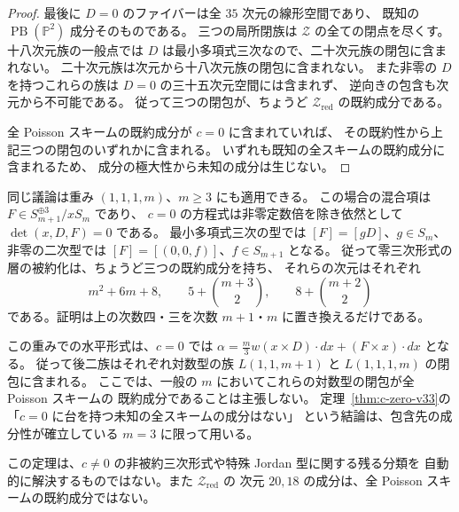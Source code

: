 \begin{proof}
最後に $D=0$ のファイバーは全 $35$ 次元の線形空間であり、
既知の $\operatorname{PB}(\mathbb P^2)$ 成分そのものである。
三つの局所閉族は $\mathcal Z$ の全ての閉点を尽くす。
十八次元族の一般点では $D$ は最小多項式三次なので、二十次元族の閉包に含まれない。
二十次元族は次元から十八次元族の閉包に含まれない。
また非零の $D$ を持つこれらの族は $D=0$ の三十五次元空間には含まれず、
逆向きの包含も次元から不可能である。
従って三つの閉包が、ちょうど $\mathcal Z_{\mathrm{red}}$ の既約成分である。

全 Poisson スキームの既約成分が $c=0$ に含まれていれば、
その既約性から上記三つの閉包のいずれかに含まれる。
いずれも既知の全スキームの既約成分に含まれるため、
成分の極大性から未知の成分は生じない。
\end{proof}

\begin{remark}[一般重みでの零三次形式の層]
同じ議論は重み $(1,1,1,m)$、$m\ge3$ にも適用できる。
この場合の混合項は $F\in S_{m+1}^{\oplus3}/xS_m$ であり、
$c=0$ の方程式は非零定数倍を除き依然として $\det(x,D,F)=0$ である。
最小多項式三次の型では $[F]=[gD]$、$g\in S_m$、
非零の二次型では $[F]=[(0,0,f)]$、$f\in S_{m+1}$ となる。
従って零三次形式の層の被約化は、ちょうど三つの既約成分を持ち、
それらの次元はそれぞれ
\[
 m^2+6m+8,\qquad 5+\binom{m+3}{2},\qquad
 8+\binom{m+2}{2}
\]
である。証明は上の次数四・三を次数 $m+1$・$m$ に置き換えるだけである。

この重みでの水平形式は、$c=0$ では
$\alpha=\tfrac m3w(x\times D)\cdot dx+(F\times x)\cdot dx$ となる。
従って後二族はそれぞれ対数型の族
$L(1,1,m+1)$ と $L(1,1,1,m)$ の閉包に含まれる。
ここでは、一般の $m$ においてこれらの対数型の閉包が全 Poisson スキームの
既約成分であることは主張しない。
定理~\ref{thm:c-zero-v33}の「$c=0$ に台を持つ未知の全スキームの成分はない」
という結論は、包含先の成分性が確立している $m=3$ に限って用いる。
\end{remark}

この定理は、$c\ne0$ の非被約三次形式や特殊 Jordan 型に関する残る分類を
自動的に解決するものではない。また $\mathcal Z_{\mathrm{red}}$ の
次元 $20,18$ の成分は、全 Poisson スキームの既約成分ではない。
